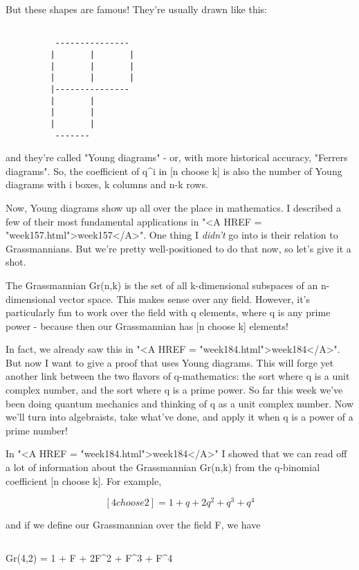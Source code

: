 But these shapes are famous!  They're usually drawn like this:



\begin{verbatim}

          ---------------
         |       |       |
         |       |       |
         |       |       |
         |---------------
         |       |       
         |       |       
         |       |       
          -------
\end{verbatim}
    

and they're called "Young diagrams" - or, with more historical
accuracy, "Ferrers diagrams".  So, the coefficient of q^i in
[n choose k] is also the number of Young diagrams with i boxes, k
columns and n-k rows.

Now, Young diagrams show up all over the place in mathematics.  I
described a few of their most fundamental applications in "<A HREF
= "week157.html">week157</A>".  One thing I \emph{didn't} go into is
their relation to Grassmannians.  But we're pretty well-positioned to do
that now, so let's give it a shot.

The Grassmannian Gr(n,k) is the set of all k-dimensional subspaces 
of an n-dimensional vector space.  This makes sense over any field.
However, it's particularly fun to work over the field with q elements, 
where q is any prime power - because then our Grassmannian has [n choose k] 
elements!  

In fact, we already saw this in "<A HREF =
"week184.html">week184</A>".  But now I want to give a proof that
uses Young diagrams.  This will forge yet another link between the two
flavors of q-mathematics: the sort where q is a unit complex number, and
the sort where q is a prime power.  So far this week we've been doing
quantum mechanics and thinking of q as a unit complex number.  Now we'll
turn into algebraists, take what've done, and apply it when q is a power
of a prime number!

In "<A HREF = "week184.html">week184</A>" I showed that we can
read off a lot of information about the Grassmannian Gr(n,k) from the
q-binomial coefficient [n choose k].  For example,


$$

[4 choose 2] = 1 + q + 2q^{2} + q^{3} + q^{4}
$$
    
and if we define our Grassmannian over the field F, we have

$$

     Gr(4,2) = 1 + F + 2F^{2} + F^{3} + F^{4}


